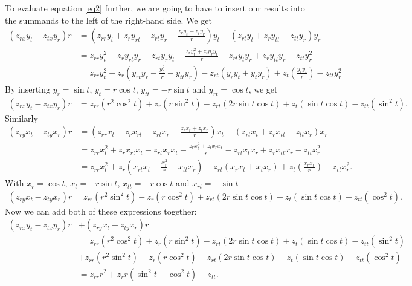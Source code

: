 \documentclass{article}
\begin{document}
To evaluate equation \ref{eq2} further, we are going to have to insert our
results into the summands to the left of the right-hand side. We get
\begin{align*}
  (z_{rx} y_t - z_{tx} y_r)r &= \left(
    z_{rr}y_t + z_r y_{rt} - z_{rt} y_r - \frac{z_r y_t + z_t y_r}{r}\right) y_t
    -\left(z_{rt}y_t + z_r y_{tt} - z_{tt} y_r\right)y_r\\
    &= z_{rr}y^2_t + z_r y_{rt}y_r-z_{rt}y_ry_t - \frac{z_ry^2_t + z_t y_r y_t}{r} - z_{rt}y_t y_r + z_r y_{tt} y_r - z_{tt} y^2_r\\
    &= z_{rr}y^2_t + z_r \left(y_{rt} y_r - \frac{y^2_t}{r}-y_{tt} y_r\right) - z_{rt} \left(y_r y_t + y_t y_r\right) 
    + z_t \left(\frac{y_r y_t}{r}\right) - z_{tt} y^2_r
\end{align*}
By inserting $y_r = \sin t$, $y_t = r\cos t$, $y_{tt} = -r \sin t$ and $y_{rt} = \cos t$, we get
\begin{align*}
  (z_{rx} y_t - z_{tx} y_r)r &= z_{rr}(r^2 \cos^2 t) + z_r (r\sin^2 t) - z_{rt} (2r \sin t \cos t) + z_t (\sin t \cos t) - z_{tt} (\sin^2 t).
\end{align*}
Similarly
\begin{align*}
  (z_{ry}x_t - z_{ty}x_r)r &= \left(
    z_{rr}x_t + z_r x_{rt} - z_{rt}x_r - \frac{z_r x_t + z_t x_r}{r}
  \right) x_t 
  -\left(z_{rt}x_t + z_r x_{tt} - z_{tt} x_r\right)x_r\\
  &=z_{rr}x^2_t + z_r x_{rt} x_t - z_{rt}x_r x_t - \frac{z_r x^2_t + z_t x_r x_t}{r}-z_{rt}x_t x_r + z_r x_{tt} x_r - z_{tt} x^2_r\\
  &=z_{rr} x^2_t + z_r \left(x_{rt}x_t - \frac{x^2_t}{r}+x_{tt} x_r\right) - z_{rt} (x_r x_t + x_t x_r) + z_t\left(\frac{x_r x_t}{r}\right)
  - z_{tt} x^2_r.
\end{align*}
With $x_r = \cos t$, $x_t = -r \sin t$, $x_{tt}=-r\cos t$ and $x_{rt}=-\sin t$
\begin{align*}
  (z_{ry}x_t - z_{ty}x_r)r= z_{rr}(r^2 \sin^2 t) - z_r (r\cos^2 t) + z_{rt}(2r\sin t\cos t) - z_t(\sin t \cos t) - z_{tt}(\cos^2 t).
\end{align*}
Now we can add both of these expressions together:
\begin{align*}
  (z_{rx}y_t - z_{tx}y_r)r &+ (z_{ry}x_t-z_{ty}x_r)r\\
  &= z_{rr}(r^2 \cos^2 t) + z_r (r\sin^2 t) - z_{rt} (2r \sin t \cos t) + z_t (\sin t \cos t) - z_{tt} (\sin^2 t)\\
  &+z_{rr}(r^2 \sin^2 t) - z_r (r\cos^2 t) + z_{rt}(2r\sin t\cos t) - z_t(\sin t \cos t) - z_{tt}(\cos^2 t)\\
  &=z_{rr}r^2+z_r r(\sin^2 t - \cos^2 t) - z_{tt}.
\end{align*}
\end{document}
